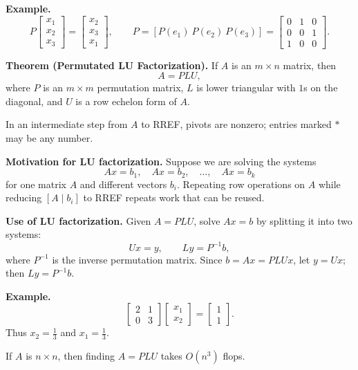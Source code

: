 \documentclass{article}
\begin{document}
\textbf{Example.}
\[
P\begin{bmatrix}x_1\\x_2\\x_3\end{bmatrix}
=
\begin{bmatrix}x_2\\x_3\\x_1\end{bmatrix},
\qquad
P=[P(e_1)\ P(e_2)\ P(e_3)]
=
\begin{bmatrix}0&1&0\\0&0&1\\1&0&0\end{bmatrix}.
\]

\bigskip

\textbf{Theorem (Permutated LU Factorization).} If $A$ is an $m\times n$ matrix, then
\[
A=PLU,
\]
where $P$ is an $m\times m$ permutation matrix, $L$ is lower triangular with $1$s on the diagonal, and $U$ is a row echelon form of $A$.

\medskip

In an intermediate step from $A$ to RREF, pivots are nonzero; entries marked $*$ may be any number.

\bigskip

\textbf{Motivation for LU factorization.} Suppose we are solving the systems
\[
Ax=b_1,\quad Ax=b_2,\quad \ldots,\quad Ax=b_k
\]
for one matrix $A$ and different vectors $b_i$. Repeating row operations on $A$ while reducing $[A\mid b_i]$ to RREF repeats work that can be reused.

\medskip

\textbf{Use of LU factorization.} Given $A=PLU$, solve $Ax=b$ by splitting it into two systems:
\[
Ux=y,
\qquad
Ly=P^{-1}b,
\]
where $P^{-1}$ is the inverse permutation matrix. Since $b=Ax=PLUx$, let $y=Ux$; then $Ly=P^{-1}b$.

\bigskip

\textbf{Example.}
\[
\begin{bmatrix}2&1\\0&3\end{bmatrix}
\begin{bmatrix}x_1\\x_2\end{bmatrix}
=
\begin{bmatrix}1\\1\end{bmatrix}.
\]
Thus $x_2=\frac13$ and $x_1=\frac13$.

\newpage

If $A$ is $n\times n$, then finding $A=PLU$ takes $O(n^3)$ flops.
\end{document}
